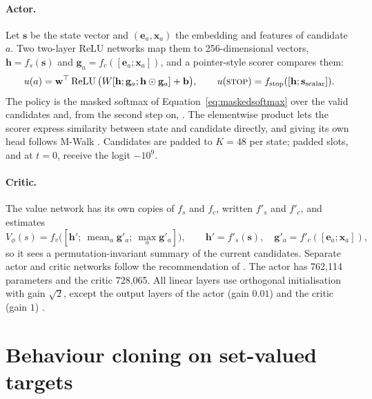 \paragraph{Actor.} Let $\mathbf{s}$ be the state vector and $(\mathbf{e}_a,\mathbf{x}_a)$ the embedding and features of candidate $a$. Two two-layer ReLU networks map them to 256-dimensional vectors, $\mathbf{h}=f_s(\mathbf{s})$ and $\mathbf{g}_a=f_c([\mathbf{e}_a;\mathbf{x}_a])$, and a pointer-style scorer compares them:
\begin{equation}
  u(a)=\mathbf{w}^\top\operatorname{ReLU}\big(W[\mathbf{h};\mathbf{g}_a;\mathbf{h}\odot\mathbf{g}_a]+\mathbf{b}\big),\qquad
  u(\textsc{stop})=f_{\mathrm{stop}}([\mathbf{h};\mathbf{s}_{\mathrm{scalar}}]).
\end{equation}
The policy is the masked softmax of Equation~\eqref{eq:maskedsoftmax} over the valid candidates and, from the second step on, \STOP. The elementwise product lets the scorer express similarity between state and candidate directly, and giving \STOP{} its own head follows M-Walk \citep{shen2018mwalk}. Candidates are padded to $K=48$ per state; padded slots, and \STOP{} at $t=0$, receive the logit $-10^9$.

\paragraph{Critic.} The value network has its own copies of $f_s$ and $f_c$, written $f'_s$ and $f'_c$, and estimates
\begin{equation*}
  V_\phi(s)=f_v\big([\mathbf{h}';\ \operatorname{mean}_a\mathbf{g}'_a;\ \max_a\mathbf{g}'_a]\big),\qquad \mathbf{h}'=f'_s(\mathbf{s}),\quad \mathbf{g}'_a=f'_c([\mathbf{e}_a;\mathbf{x}_a]),
\end{equation*}
so it sees a permutation-invariant summary of the current candidates. Separate actor and critic networks follow the recommendation of \citet{andrychowicz2021matters}. The actor has 762{,}114 parameters and the critic 728{,}065. All linear layers use orthogonal initialisation with gain $\sqrt2$, except the output layers of the actor (gain $0.01$) and the critic (gain $1$) \citep{andrychowicz2021matters,engstrom2020implementation}.

\section{Behaviour cloning on set-valued targets}
\label{sec:bc}

